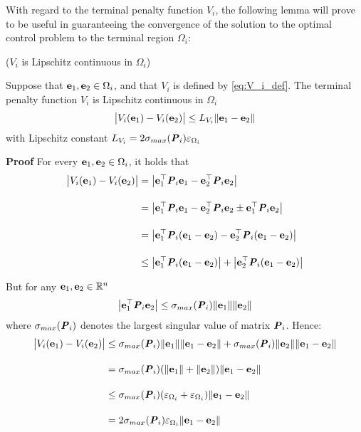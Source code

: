 With regard to the terminal penalty function $V_i$, the following lemma will
prove to be useful in guaranteeing the convergence of the solution to the
optimal control problem to the terminal region $\Omega_i$:

\begin{bw_box}
\begin{lemma} ($V_i$ is Lipschitz continuous in $\Omega_i$)
\label{lemma:V_Lipschitz_e_0}

  Suppose that $\bm{\mathbf{e}}_1, \bm{\mathbf{e}}_2 \in \Omega_i$, and that
  $V_i$ is defined by \eqref{eq:V_i_def}. The terminal penalty function
  $V_i$ is Lipschitz continuous in $\Omega_i$
  $$\big|V_i(\bm{\mathbf{e}}_1) - V_i(\bm{\mathbf{e}}_2)\big| \leq L_{V_i} \|\bm{\mathbf{e}}_1 - \bm{\mathbf{e}}_2\|$$
  with Lipschitz constant $L_{V_i} = 2 \sigma_{max}(\bm{\mathit{P}}_i) \varepsilon_{\Omega_i} $\\

\end{lemma}
\end{bw_box}


\begin{gg_box}
\textbf{Proof} For every $\bm{\mathbf{e}}_1, \bm{\mathbf{e}}_2 \in \Omega_i$, it holds that
\begin{align}
  \big|V_i(\bm{\mathbf{e}}_1) - V_i(\bm{\mathbf{e}}_2)\big| &= \big|\bm{\mathbf{e}}_1^{\top} \bm{\mathit{P}}_i \bm{\mathbf{e}}_1 - \bm{\mathbf{e}}_2^{\top} \bm{\mathit{P}}_i \bm{\mathbf{e}}_2\big| \\[2.5ex]
    &= \big|\bm{\mathbf{e}}_1^{\top} \bm{\mathit{P}}_i \bm{\mathbf{e}}_1 - \bm{\mathbf{e}}_2^{\top} \bm{\mathit{P}}_i \bm{\mathbf{e}}_2 \pm \bm{\mathbf{e}}_1^{\top} \bm{\mathit{P}}_i \bm{\mathbf{e}}_2\big| \\[2.5ex]
    &= \big|\bm{\mathbf{e}}_1^{\top} \bm{\mathit{P}}_i (\bm{\mathbf{e}}_1 -\bm{\mathbf{e}}_2) - \bm{\mathbf{e}}_2^{\top} \bm{\mathit{P}}_i (\bm{\mathbf{e}}_1-\bm{\mathbf{e}}_2)\big| \\[2.5ex]
    &\leq \big|\bm{\mathbf{e}}_1^{\top} \bm{\mathit{P}}_i (\bm{\mathbf{e}}_1 -\bm{\mathbf{e}}_2)\big| + \big|\bm{\mathbf{e}}_2^{\top} \bm{\mathit{P}}_i (\bm{\mathbf{e}}_1-\bm{\mathbf{e}}_2)\big|
\end{align}

But for any $\bm{\mathbf{e}}_1, \bm{\mathbf{e}}_2 \in \mathbb{R}^n$
$$\big|\bm{\mathbf{e}}_1^{\top} \bm{\mathit{P}}_i \bm{\mathbf{e}}_2\big| \leq \sigma_{max}(\bm{\mathit{P}}_i) \|\bm{\mathbf{e}}_1\| \|\bm{\mathbf{e}}_2\|$$
where $\sigma_{max}(\bm{\mathit{P}}_i)$ denotes the largest singular value of matrix
$\bm{\mathit{P}}_i$. Hence:
\begin{align}
\big|V_i(\bm{\mathbf{e}}_1) - V_i(\bm{\mathbf{e}}_2)\big| &\leq
  \sigma_{max}(\bm{\mathit{P}}_i) \|\bm{\mathbf{e}}_1\| \|\bm{\mathbf{e}}_1 - \bm{\mathbf{e}}_2\| +
  \sigma_{max}(\bm{\mathit{P}}_i) \|\bm{\mathbf{e}}_2\| \|\bm{\mathbf{e}}_1 - \bm{\mathbf{e}}_2\| \\[2.5ex]
  &= \sigma_{max}(\bm{\mathit{P}}_i) (\|\bm{\mathbf{e}}_1\| + \|\bm{\mathbf{e}}_2\|)\|\bm{\mathbf{e}}_1 - \bm{\mathbf{e}}_2\| \\[2.5ex]
  & \leq \sigma_{max}(\bm{\mathit{P}}_i) (\varepsilon_{\Omega_i} + \varepsilon_{\Omega_i})\|\bm{\mathbf{e}}_1 - \bm{\mathbf{e}}_2\| \\[2.5ex]
  &= 2 \sigma_{max}(\bm{\mathit{P}}_i) \varepsilon_{\Omega_i} \|\bm{\mathbf{e}}_1 - \bm{\mathbf{e}}_2\|
\end{align}
\qedsymbol
\end{gg_box}

